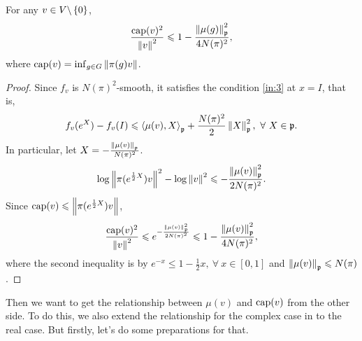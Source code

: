 \documentclass[suri,pdfbookmark]{engsuribt} %
\begin{document}
  \begin{thm}\label{thm:3}
    For any $v \in V \backslash \left\{0\right\}$,
    \begin{equation*}
      \frac{\operatorname{cap}(v)^2}{\left\lVert v\right\lVert^2} \leqslant 1 - \frac{\left\lVert\mu(g)\right\lVert_{\mathfrak{p}}^2}{4N(\pi)^2},
    \end{equation*}
    where $\operatorname{cap}(v) = \inf_{g \in G} \left\lVert\pi(g)v\right\lVert$.
  \end{thm}
  \begin{proof}
    Since $f_v$ is $N(\pi)^2$-smooth, it satisfies the condition \ref{in:3} at $x = I$, that is,
    \begin{equation*}
      f_v(e^X) - f_v(I) \leqslant \left\langle \mu(v),X \right\rangle_{\mathfrak{p}} + \frac{N(\pi)^2}{2} \left\lVert X\right\lVert_{\mathfrak{p}}^2,~\forall~X \in \mathfrak{p}.
    \end{equation*}
    In particular, let $X = -\frac{\left\lVert\mu(v)\right\lVert_{\mathfrak{p}}}{N(\pi)^2}$.
    \begin{equation*}
      \log \left\lVert\pi(e^{\frac{1}{2}X})v\right\lVert^2 - \log \left\lVert v\right\lVert^2  \leqslant -\frac{\left\lVert\mu(v)\right\lVert_{\mathfrak{p}}^2}{2N(\pi)^2}.
    \end{equation*}
    Since $\operatorname{cap}(v) \leqslant \left\lVert\pi(e^{\frac{1}{2}X})v\right\lVert$,
    \begin{equation*}
      \frac{\operatorname{cap}(v)^2}{\left\lVert v\right\lVert^2} \leqslant e^{-\frac{\left\lVert\mu(v)\right\lVert_{\mathfrak{p}}^2}{2N(\pi)^2}} \leqslant 1-\frac{\left\lVert\mu(v)\right\lVert_{\mathfrak{p}}^2}{4N(\pi)^2},
    \end{equation*}
    where the second inequality is by $ e^{-x} \leqslant 1 - \frac{1}{2}x,~\forall~ x\in [0,1]$ and $\left\lVert\mu(v)\right\lVert_{\mathfrak{p}} \leqslant N(\pi)$.
  \end{proof}

  Then we want to get the relationship between $\mu(v)$ and $\operatorname{cap}(v)$ from the other side. To do this, we also extend the relationship for the complex case in \cite{key8} to the real case. But firstly, let's do some preparations for that.
\end{document}
